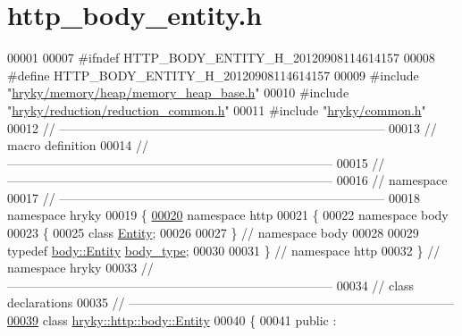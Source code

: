\hypertarget{http__body__entity_8h_source}{\section{http\-\_\-body\-\_\-entity.\-h}
}

\begin{DoxyCode}
00001 
00007 \textcolor{preprocessor}{#ifndef HTTP\_BODY\_ENTITY\_H\_20120908114614157}
00008 \textcolor{preprocessor}{}\textcolor{preprocessor}{#define HTTP\_BODY\_ENTITY\_H\_20120908114614157}
00009 \textcolor{preprocessor}{}\textcolor{preprocessor}{#include "\hyperlink{memory__heap__base_8h}{hryky/memory/heap/memory_heap_base.h}"}
00010 \textcolor{preprocessor}{#include "\hyperlink{reduction__common_8h}{hryky/reduction/reduction_common.h}"}
00011 \textcolor{preprocessor}{#include "\hyperlink{common_8h}{hryky/common.h}"}
00012 \textcolor{comment}{//
      ------------------------------------------------------------------------------}
00013 \textcolor{comment}{// macro definition}
00014 \textcolor{comment}{//
      ------------------------------------------------------------------------------}
00015 \textcolor{comment}{//
      ------------------------------------------------------------------------------}
00016 \textcolor{comment}{// namespace}
00017 \textcolor{comment}{//
      ------------------------------------------------------------------------------}
00018 \textcolor{keyword}{namespace }hryky
00019 \{
\hypertarget{http__body__entity_8h_source_l00020}{}\hyperlink{namespacehryky_1_1http}{00020} \textcolor{keyword}{namespace }http
00021 \{
00022 \textcolor{keyword}{namespace }body
00023 \{
00025     \textcolor{keyword}{class }\hyperlink{classhryky_1_1http_1_1_entity}{Entity};
00026 
00027 \} \textcolor{comment}{// namespace body}
00028 
00029 \textcolor{keyword}{typedef} \hyperlink{classhryky_1_1http_1_1body_1_1_entity}{body::Entity} \hyperlink{classhryky_1_1http_1_1body_1_1_entity}{body_type};
00030 
00031 \} \textcolor{comment}{// namespace http}
00032 \} \textcolor{comment}{// namespace hryky}
00033 \textcolor{comment}{//
      ------------------------------------------------------------------------------}
00034 \textcolor{comment}{// class declarations}
00035 \textcolor{comment}{//
      ------------------------------------------------------------------------------}
\hypertarget{http__body__entity_8h_source_l00039}{}\hyperlink{classhryky_1_1http_1_1body_1_1_entity}{00039} \textcolor{comment}{}\textcolor{keyword}{class }\hyperlink{classhryky_1_1http_1_1body_1_1_entity}{hryky::http::body::Entity}
00040 \{
00041 \textcolor{keyword}{public} :

\end{DoxyCode}
